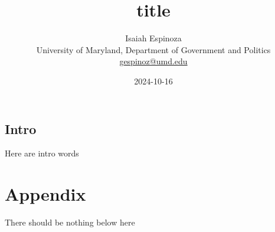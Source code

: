 \documentclass[
  12pt,
  letterpaper,
]{article}
\title{title}
\author{
Isaiah Espinoza\\University of Maryland, Department of Government and
Politics\\\href{mailto:gespinoz@umd.edu}{gespinoz@umd.edu}}
\date{2024-10-16}
\begin{document}
\maketitle



\pagebreak

\subsection{Intro}\label{intro}

Here are intro words

\pagebreak

\section{Appendix}\label{appendix}

There should be nothing below here
\end{document}
